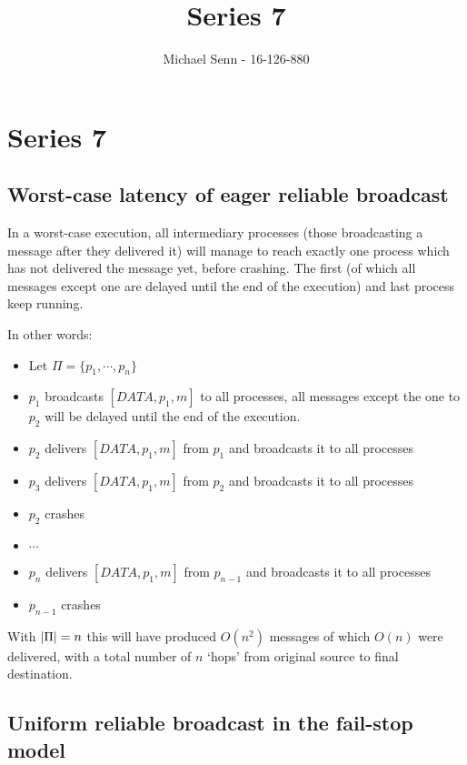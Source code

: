 \documentclass[a4paper]{scrreprt}
\title{Series 7}
\author{Michael Senn \maillink{michael.senn@students.unibe.ch} - 16-126-880}
\date{\printdate}
\DeclarePairedDelimiter\abs{\lvert}{\rvert}
\begin{document}
\maketitle


\setcounter{chapter}{6}

\chapter{Series 7}

\section{Worst-case latency of eager reliable broadcast}

In a worst-case execution, all intermediary processes (those broadcasting a
message after they delivered it) will manage to reach exactly one process which
has not delivered the message yet, before crashing. The first (of which all
messages except one are delayed until the end of the execution) and last
process keep running.

In other words:
\begin{itemize}
	\item Let $\Pi = \{p_1, \cdots, p_n\}$
	\item $p_1$ broadcasts $[DATA, p_1, m]$ to all processes, all messages
		except the one to $p_2$ will be delayed until the end of the
		execution.
	\item $p_2$ delivers $[DATA, p_1, m]$ from $p_1$ and broadcasts it to
		all processes
	\item $p_3$ delivers $[DATA, p_1, m]$ from $p_2$ and broadcasts it to
		all processes
	\item $p_2$ crashes
	\item $\cdots$
	\item $p_n$ delivers $[DATA, p_1, m]$ from $p_{n - 1}$ and broadcasts
		it to all processes
	\item $p_{n - 1}$ crashes
\end{itemize}

With $\abs{\Pi} = n$ this will have produced $O(n^2)$ messages of which
$O(n)$ were delivered, with a total number of $n$ `hops' from original source
to final destination.

\section{Uniform reliable broadcast in the fail-stop model}
\end{document}
